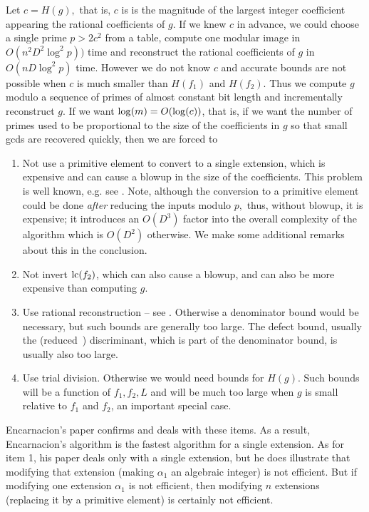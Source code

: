 \documentclass[10pt]{article}
\begin{document}
Let $c = H(g),$ that is, $c$ is is the magnitude of the largest
integer coefficient appearing the rational coefficients of $g.$
If we knew $c$ in advance, we could choose a single prime $p > 2 c^2$ from
a table, compute one modular image in $O(n^2 D^2 \log^2 p))$ time
and reconstruct the rational coefficients of $g$ in $O( n D \log^2 p )$ time.
However we do not know $c$ and accurate bounds are not possible when $c$
is much smaller than $H(f_1)$ and $H(f_2)$.
Thus we compute $g$ modulo a sequence of primes of almost constant bit length
and incrementally reconstruct $g$.
If we want ${\rm log}(m)=O({\rm log}(c))$, that is, if we want
the number of primes used to be proportional to the size of
the coefficients in $g$ so that small gcds are recovered quickly,
then we are forced to
\begin{enumerate}

\item Not use a primitive element to convert to a single extension,
which is expensive and can cause a blowup in the size of the coefficients.
This problem is well known, e.g. see \cite{Abbott}.  Note, although the conversion
to a primitive element could be done {\em after} reducing the inputs modulo $p,$
thus, without blowup, it is expensive; it introduces an $O(D^3)$ factor
into the overall complexity of the algorithm which is $O(D^2)$ otherwise.
We make some additional remarks about this in the conclusion.

\item Not invert ${\rm lc}(f_2)$, which can also cause a blowup, and can
also be more expensive than computing $g$.

\item Use rational reconstruction -- see \cite{Collins,MQRR,Pan,Wang}.
Otherwise a denominator bound would be necessary, but such bounds
are generally too large. The defect bound, usually the
(reduced~\cite{Bradford}) discriminant, which is part of the denominator
bound, is usually also too large.

\item Use trial division.  Otherwise we would need bounds for $H(g)$.
Such bounds will be a function of $f_1, f_2, L$ and will be much too
large when $g$ is small relative to $f_1$ and $f_2$, an important
special case.

\end{enumerate}
Encarnacion's paper confirms and deals with these items.
As a result, Encarnacion's algorithm is the fastest algorithm
for a single extension.
As for item 1, his paper deals only with a single extension, but he
does illustrate that modifying that extension (making $\alpha_1$
an algebraic integer) is not efficient. But if modifying one
extension $\alpha_1$ is not efficient, then modifying $n$ extensions
(replacing it by a primitive element) is certainly not efficient.
\end{document}
